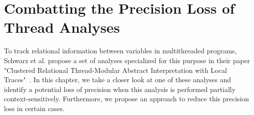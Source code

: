 
\chapter{Combatting the Precision Loss of Thread Analyses}\label{chapter:precisionLossThreadAnalyses}
  To track relational information between variables in multithreaded programs, Schwarz et al. propose a set of analyses specialized for this purpose in their paper "Clustered Relational Thread-Modular Abstract Interpretation with Local Traces"~\parencite{schwarz2023clustered}. In this chapter, we take a closer look at one of these analyses and identify a potential loss of precision when this analysis is performed partially context-sensitively. Furthermore, we propose an approach to reduce this precision loss in certain cases.
